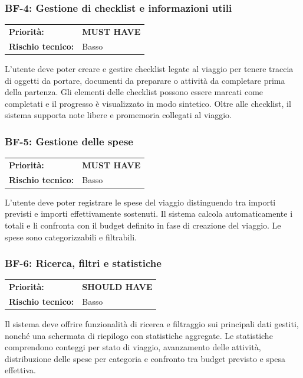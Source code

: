 \documentclass[12pt, a4paper]{article}
\newcommand{\MUST}{\colorbox{musthave}{\small\textbf{MUST HAVE}}}
\newcommand{\SHOULD}{\colorbox{shouldhave}{\small\textbf{SHOULD HAVE}}}
\newcommand{\RISKL}{\colorbox{risklow}{\small Basso}}
\begin{document}
\subsubsection{BF-4: Gestione di checklist e informazioni utili}

\begin{tabular}{@{}ll@{}}
  \toprule
  \textbf{Priorità:}        & \MUST \\
  \textbf{Rischio tecnico:} & \RISKL \\
  \bottomrule
\end{tabular}

\medskip
\noindent
L'utente deve poter creare e gestire checklist legate al viaggio per tenere traccia di
oggetti da portare, documenti da preparare o attività da completare prima della partenza.
Gli elementi delle checklist possono essere marcati come completati e il progresso è
visualizzato in modo sintetico. Oltre alle checklist, il sistema supporta note libere
e promemoria collegati al viaggio.

\subsubsection{BF-5: Gestione delle spese}

\begin{tabular}{@{}ll@{}}
  \toprule
  \textbf{Priorità:}        & \MUST \\
  \textbf{Rischio tecnico:} & \RISKL \\
  \bottomrule
\end{tabular}

\medskip
\noindent
L'utente deve poter registrare le spese del viaggio distinguendo tra importi previsti
e importi effettivamente sostenuti. Il sistema calcola automaticamente i totali e li
confronta con il budget definito in fase di creazione del viaggio. Le spese sono
categorizzabili e filtrabili.

\subsubsection{BF-6: Ricerca, filtri e statistiche}

\begin{tabular}{@{}ll@{}}
  \toprule
  \textbf{Priorità:}        & \SHOULD \\
  \textbf{Rischio tecnico:} & \RISKL \\
  \bottomrule
\end{tabular}

\medskip
\noindent
Il sistema deve offrire funzionalità di ricerca e filtraggio sui principali dati gestiti,
nonché una schermata di riepilogo con statistiche aggregate. Le statistiche comprendono
conteggi per stato di viaggio, avanzamento delle attività, distribuzione delle spese per
categoria e confronto tra budget previsto e spesa effettiva.
\end{document}

